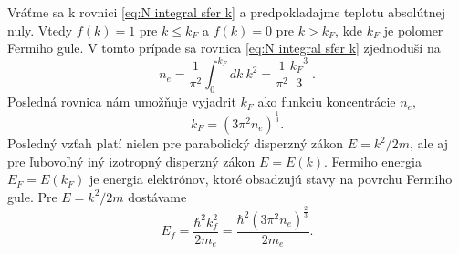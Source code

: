 Vráťme sa k rovnici \eqref{eq:N integral sfer k} a predpokladajme teplotu absolútnej nuly. Vtedy $f(k)=1$ pre $k \leq k_F$ a $f(k)=0$ pre $k > k_F$, kde $k_F$ je polomer Fermiho gule. V tomto prípade sa rovnica \eqref{eq:N integral sfer k} zjednoduší na
\begin{equation}
 \label{eq:N integral sfer k nula}
 n_e =   \frac{1}{\pi^2} \int_0^{k_F} dk \ k^2  = \frac{1}{\pi^2} \frac{{k_F}^3}{3} \ \text{.}
\end{equation}
Posledná rovnica nám umožňuje vyjadrit $k_F$ ako funkciu koncentrácie $n_e$,
\begin{equation}
 \label{eq:kf}
 k_F=(3\pi^2 n_e)^{\frac{1}{3}}\text{.}
\end{equation}
Posledný vzťah platí nielen pre parabolický disperzný zákon $E = k^2/2m$, ale aj pre ľubovoľný iný izotropný disperzný zákon $E=E(k)$. 
Fermiho energia $E_F=E(k_F)$ je energia elektrónov, ktoré obsadzujú stavy na povrchu Fermiho gule. Pre $E = k^2/2m$
dostávame
\begin{equation}
 \label{eq:ef}
 E_f=\frac{\hbar^2 k_f^2}{2m_e}=\frac{\hbar^2(3\pi^2 n_e)^{\frac{2}{3}}  }{2m_e} \text{.}
\end{equation}

